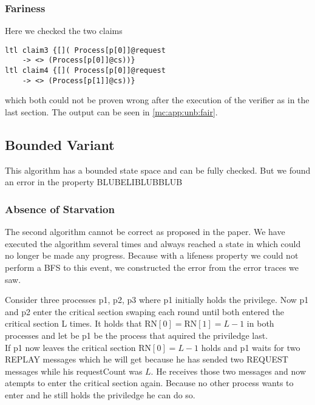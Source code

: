\documentclass{llncs}
\begin{document}
\subsubsection{Fariness}

Here we checked the two claims

\begin{lstlisting}
ltl claim3 {[]( Process[p[0]]@request 
    -> <> (Process[p[0]]@cs))}
ltl claim4 {[]( Process[p[0]]@request 
    -> <> (Process[p[1]]@cs))}
\end{lstlisting}

which both could not be proven wrong after the execution of the verifier as in the last section.
The output can be seen in \ref{mc:app:unb:fair}.

\subsection{Bounded Variant}

This algorithm has a bounded state space and can be fully checked.
But we found an error in the property BLUBELIBLUBBLUB


\subsubsection{Absence of Starvation}

The second algorithm cannot be correct as proposed in the paper.
We have executed the algorithm several times and always reached a state in which
could no longer be made any progress. Because with a lifeness property we could
not perform a BFS to this event, we constructed the error from the error traces we saw.

Consider three processes p1, p2, p3 where p1 initially holds the privilege.
Now p1 and p2 enter the critical section swaping each round until both entered the critical section
L times. It holds that
$\text{RN}[0] =\text{RN}[1] = L - 1$ in both processes
and let be p1 be the process that aquired the priviledge last.\\

If p1 now leaves the critical section $\text{RN}[0] = L - 1$ holds and
p1 waits for two REPLAY messages which he will get because he has sended two REQUEST messages
while his requestCount was $L$. He receives those two messages and now atempts to
enter the critical section again. Because no other process wants to enter and he still holds
the priviledge he can do so.\\
\end{document}
